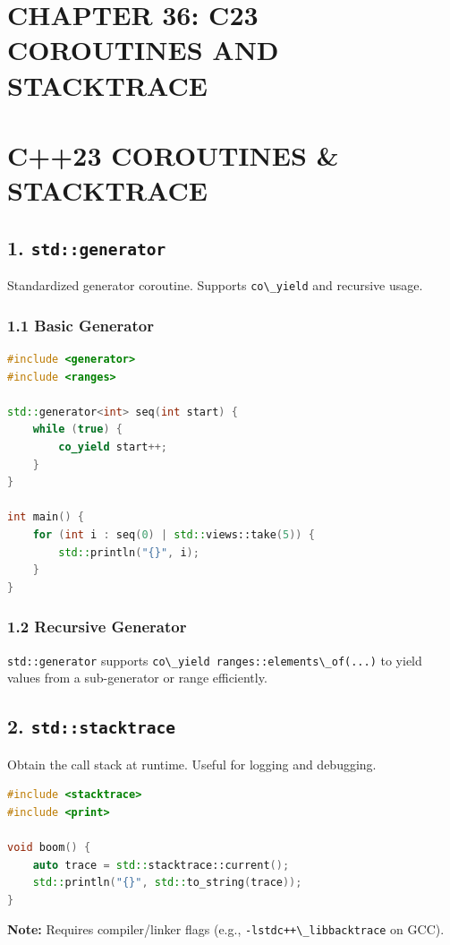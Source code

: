 \hypertarget{chapter-36-c23-coroutines-and-stacktrace}{%
\section{CHAPTER 36: C23 COROUTINES AND
STACKTRACE}\label{chapter-36-c23-coroutines-and-stacktrace}}

\hypertarget{c23-coroutines-stacktrace}{%
\section{C++23 COROUTINES \&
STACKTRACE}\label{c23-coroutines-stacktrace}}

\hypertarget{stdgenerator}{%
\subsection{\texorpdfstring{1.
\texttt{std::generator}}{1. std::generator}}\label{stdgenerator}}

Standardized generator coroutine. Supports
\passthrough{\lstinline!co\_yield!} and recursive usage.

\hypertarget{basic-generator}{%
\subsubsection{1.1 Basic Generator}\label{basic-generator}}

\begin{lstlisting}[language={C++}]
#include <generator>
#include <ranges>

std::generator<int> seq(int start) {
    while (true) {
        co_yield start++;
    }
}

int main() {
    for (int i : seq(0) | std::views::take(5)) {
        std::println("{}", i);
    }
}
\end{lstlisting}

\hypertarget{recursive-generator}{%
\subsubsection{1.2 Recursive Generator}\label{recursive-generator}}

\passthrough{\lstinline!std::generator!} supports
\passthrough{\lstinline!co\_yield ranges::elements\_of(...)!} to yield
values from a sub-generator or range efficiently.

\hypertarget{stdstacktrace}{%
\subsection{\texorpdfstring{2.
\texttt{std::stacktrace}}{2. std::stacktrace}}\label{stdstacktrace}}

Obtain the call stack at runtime. Useful for logging and debugging.

\begin{lstlisting}[language={C++}]
#include <stacktrace>
#include <print>

void boom() {
    auto trace = std::stacktrace::current();
    std::println("{}", std::to_string(trace));
}
\end{lstlisting}

\textbf{Note:} Requires compiler/linker flags (e.g.,
\passthrough{\lstinline!-lstdc++\_libbacktrace!} on GCC).

